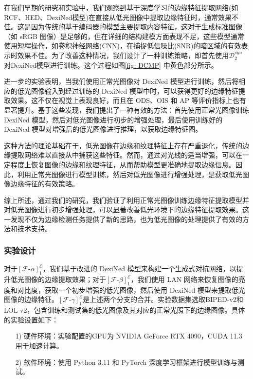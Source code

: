 \documentclass[a4paper]{ctexart}
\begin{document}
	在我们早期的研究和实验中，我们观察到基于深度学习的边缘特征提取网络(如RCF、HED、DexiNed模型)在直接从低光图像中提取边缘特征时，通常效果不佳。这是因为传统的基于编码器的模型主要提取内容特征，这对于生成标准图像（如 sRGB 图像）是足够的，但在详细的结构建模方面表现不足，这些模型通常使用短程操作，如卷积神经网络(CNN)，在捕捉低信噪比(SNR)的暗区域的有效表示时效果不佳。为了改善这种情况，我们设计了一种训练策略，即首先使用$\mathcal{D}^{syn}_2$对DexiNed模型进行训练。这个过程如图\ref{fig: DCMP} 中黄色部分所示。
	
	进一步的实验表明，当我们使用正常光图像对 DexiNed 模型进行训练，然后将相应的低光图像输入到经过训练的 DexiNed 模型中时，可以获得更好的边缘特征提取效果。这不仅在视觉上表现良好，而且在 ODS、OIS 和 AP 等评价指标上也有显著提升。基于这些发现，我们提出了一种有效的方法：首先使用正常光图像训练 DexiNed 模型，然后对低光图像进行初步的增强处理，最后使用训练好的 DexiNed 模型对增强后的低光图像进行推理，以获取边缘特征图。
	
	这种方法的理论基础在于，低光图像在边缘和纹理特征上存在严重退化，传统的边缘提取网络难以直接从中捕获这些特征。然而，通过对光线的适当增强，可以在一定程度上恢复图像的边缘和纹理特征，从而帮助模型更准确地提取边缘信息。因此，利用正常光图像进行模型训练，然后对低光图像进行增强处理，是获取低光图像边缘特征的有效策略。
	
	综上所述，通过我们的研究，我们验证了利用正常光图像训练边缘特征提取模型并对低光图像进行初步增强处理，可以显著改善低光环境下的边缘特征提取效果。这一发现不仅为边缘检测任务提供了新的思路，也为低光图像的处理提供了有效的方法和技术支持。
	
	\subsubsection{实验设计}
	
	对于${\left[\mathcal{F}\text{-}\alpha\right]}^{\mathcal{E}}_1$，我们基于改进的 DexiNed 模型来构建一个生成式对抗网络，以提升低光图像的边缘提取效果；对于${\left[\mathcal{F}\text{-}\beta\right]}^{\mathcal{E}}_1$，我们使用 LAN 网络来恢复图像的亮度和对比度，获取一个初步增强的低光图像，然后使用 DexiNed 模型来提取低光图像的边缘特征。${\left[\mathcal{F}\text{-}\gamma\right]}^{\mathcal{E}}_1$是上述两个分支的合并。实验数据集选取BIPED-v2和LOL-v2，包含训练和测试集的低光图像及其对应的正常光照下的边缘图像。具体的实验设置如下：
	
	\begin{itemize}
		\item[1)]
		硬件环境：实验配置的GPU为 NVIDIA GeForce RTX 4090，CUDA 11.3 用于加速计算。
		\item[2)]
		软件环境：使用 Python 3.11 和 PyTorch 深度学习框架进行模型训练与测试。
	\end{itemize}
	
\end{document}
